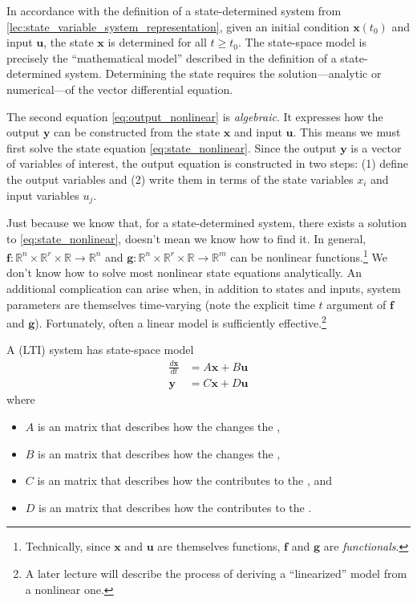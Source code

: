 \documentclass[dynamic_systems.tex]{subfiles}
\begin{document}
In accordance with the definition of a state-determined system from \autoref{lec:state_variable_system_representation}, given an initial condition $\bm{x}(t_0)$ and input $\bm{u}$, the state $\bm{x}$ is determined for all $t\ge t_0$.
The state-space model is precisely the ``mathematical model'' described in the definition of a state-determined system.
Determining the state requires the solution---analytic or numerical---of the vector differential equation.
\tags{}

The second equation \eqref{eq:output_nonlinear} is \emph{algebraic}.
It expresses how the output $\bm{y}$ can be constructed from the state $\bm{x}$ and input $\bm{u}$.
This means we must first solve the state equation \eqref{eq:state_nonlinear}.
Since the output $\bm{y}$ is a vector of variables of interest, the output equation is constructed in two steps: (1) define the output variables and (2) write them in terms of the state variables $x_i$ and input variables $u_j$.
\tags{}

Just because we know that, for a state-determined system, there exists a solution to \autoref{eq:state_nonlinear}, doesn't mean we know how to find it.
In general, $\bm{f}:\mathbb{R}^n \times \mathbb{R}^r \times \mathbb{R}\rightarrow\mathbb{R}^n$ and $\bm{g}:\mathbb{R}^n \times \mathbb{R}^r \times \mathbb{R}\rightarrow\mathbb{R}^m$ can be nonlinear functions.\footnote{Technically, since $\bm{x}$ and $\bm{u}$ are themselves functions, $\bm{f}$ and $\bm{g}$ are \emph{functionals}.}
We don't know how to solve most nonlinear state equations analytically.
An additional complication can arise when, in addition to states and inputs, system parameters are themselves time-varying (note the explicit time $t$ argument of $\bm{f}$ and $\bm{g}$).
Fortunately, often a linear model is sufficiently effective.\footnote{A later lecture will describe the process of deriving a ``linearized'' model from a nonlinear one.}
\tags{}

A  (LTI) system has state-space model
\begin{subequations}
\begin{align}
	\frac{d\bm{x}}{d t} &= A \bm{x} + B \bm{u} \label{eq:state} \\
	\bm{y} &= C \bm{x} + D \bm{u}\label{eq:output}
\end{align}
\end{subequations}
where 
\begin{itemize}
	\item $A$ is an  matrix that describes how the  changes the , 
	\item $B$ is an  matrix that describes how the  changes the , 
	\item $C$ is an  matrix that describes how the  contributes to the , and 
	\item $D$ is an  matrix that describes how the  contributes to the .
\end{itemize}
\end{document}
